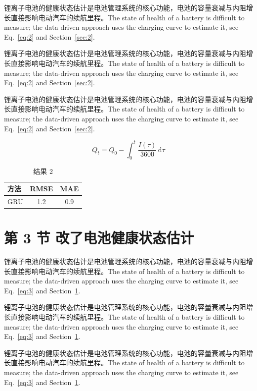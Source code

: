 \documentclass[UTF8,fontset=mac]{ctexart}
\begin{document}
锂离子电池的健康状态估计是电池管理系统的核心功能，电池的容量衰减与内阻增长直接影响电动汽车的续航里程\cite{a2020}。The state of health of a battery is difficult to measure; the data-driven approach uses the charging curve to estimate it, see Eq.~\eqref{eq:2} and Section~\ref{sec:2}.

锂离子电池的健康状态估计是电池管理系统的核心功能，电池的容量衰减与内阻增长直接影响电动汽车的续航里程\cite{a2020}。The state of health of a battery is difficult to measure; the data-driven approach uses the charging curve to estimate it, see Eq.~\eqref{eq:2} and Section~\ref{sec:2}.

锂离子电池的健康状态估计是电池管理系统的核心功能，电池的容量衰减与内阻增长直接影响电动汽车的续航里程\cite{a2020}。The state of health of a battery is difficult to measure; the data-driven approach uses the charging curve to estimate it, see Eq.~\eqref{eq:2} and Section~\ref{sec:2}.

\begin{equation}\label{eq:2}
  Q_t = Q_0 - \int_0^t \frac{I(\tau)}{3600}\,\mathrm{d}\tau
\end{equation}
\begin{table}[h]\centering\begin{tabular}{lcc}\toprule 方法 & RMSE & MAE\\\midrule GRU & 1.2 & 0.9\\\bottomrule\end{tabular}\caption{结果 2}\end{table}

\section{第 3 节 改了电池健康状态估计}\label{sec:3}
锂离子电池的健康状态估计是电池管理系统的核心功能，电池的容量衰减与内阻增长直接影响电动汽车的续航里程\cite{a2020}。The state of health of a battery is difficult to measure; the data-driven approach uses the charging curve to estimate it, see Eq.~\eqref{eq:3} and Section~\ref{sec:3}.

锂离子电池的健康状态估计是电池管理系统的核心功能，电池的容量衰减与内阻增长直接影响电动汽车的续航里程\cite{a2020}。The state of health of a battery is difficult to measure; the data-driven approach uses the charging curve to estimate it, see Eq.~\eqref{eq:3} and Section~\ref{sec:3}.

锂离子电池的健康状态估计是电池管理系统的核心功能，电池的容量衰减与内阻增长直接影响电动汽车的续航里程\cite{a2020}。The state of health of a battery is difficult to measure; the data-driven approach uses the charging curve to estimate it, see Eq.~\eqref{eq:3} and Section~\ref{sec:3}.
\end{document}
